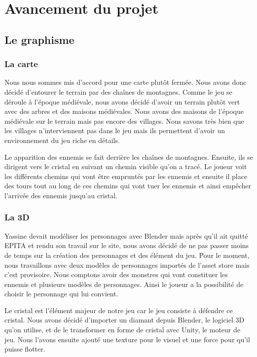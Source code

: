 \documentclass[a4paper, 12pt]{article}
\begin{document}
\section{Avancement du projet}
	\subsection{Le graphisme}
		\subsubsection{La carte}
		Nous nous sommes mis d’accord pour une carte plutôt fermée. Nous avons donc décidé d’entourer le terrain par des chaînes de montagnes. Comme le jeu se déroule à l’époque médiévale, nous avons décidé d’avoir un terrain plutôt vert avec des arbres et des maisons médiévales. Nous avons des maisons de l’époque médiévale sur le terrain mais pas encore des villages. Nous savons très bien que les villages n’interviennent pas dans le jeu mais ils permettent d’avoir un environnement du jeu riche en détails. 
\par Le apparition des ennemis se fait derrière les chaînes de montagnes. Ensuite, ils se dirigent vers le cristal en suivant un chemin visible qu’on a tracé. Le joueur voit les différents chemins qui vont être empruntés par les ennemis et ensuite il place des tours tout au long de ces chemins qui vont tuer les ennemis et ainsi empêcher l’arrivée des ennemis jusqu’au cristal.

		\subsubsection{La 3D}
		Yassine devait modéliser les personnages avec Blender mais après qu’il ait quitté EPITA et rendu son travail sur le site, nous avons décidé de ne pas passer moins de temps sur la création des personnages et des élément du jeu.  Pour le moment, nous travaillons avec deux modèles de personnages importés de l’asset store mais c’est provisoire. Nous comptons avoir des monstres qui vont constituer les ennemis et plusieurs modèles de personnages. Ainsi le joueur a la possibilité de choisir le personnage qui lui convient.  
\par Le cristal est l’élément majeur de notre jeu car le jeu consiste à défendre ce cristal. Nous avons décidé d’importer un diamant depuis Blender, le logiciel 3D qu’on utilise, et de le transformer en forme de cristal avec Unity, le moteur de jeu. Nous l’avons ensuite ajouté une texture pour le visuel et une force pour qu’il puisse flotter.
\end{document}
